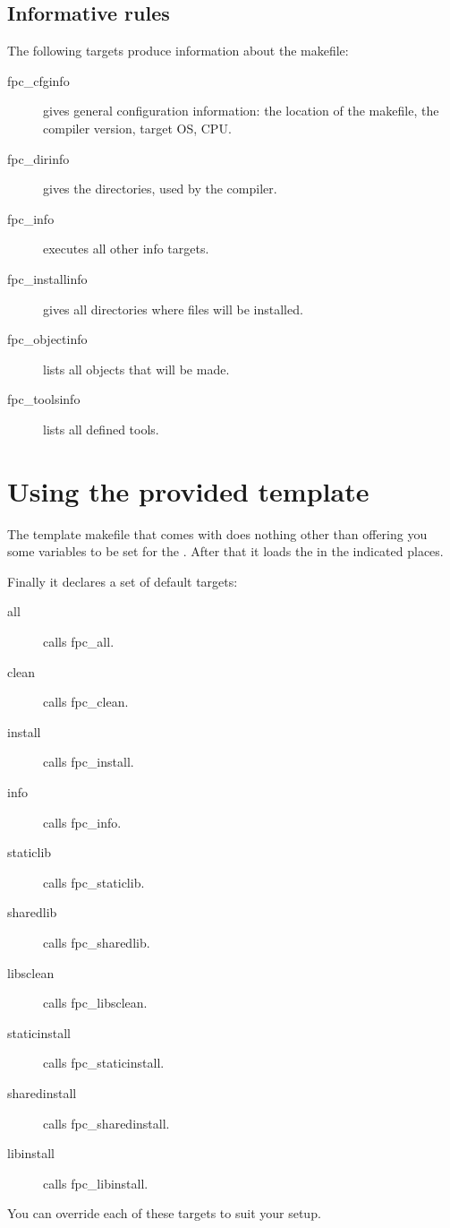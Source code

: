 \documentclass{report}
\begin{document}
\subsection{Informative rules}

The following targets produce information about the makefile:
\begin{description}
\item[fpc\_cfginfo] gives general configuration information: the location of
the makefile, the compiler version, target OS, CPU.
\item[fpc\_dirinfo] gives the directories, used by the compiler.
\item[fpc\_info] executes all other info targets.
\item[fpc\_installinfo] gives all directories where files will be installed.
\item[fpc\_objectinfo] lists all objects that will be made.
\item[fpc\_toolsinfo] lists all defined tools.
\end{description}

\section{Using the provided template}

The template makefile that comes with \fpc does nothing other than
offering you some variables to be set for the .
After that it loads the  in the indicated places.

Finally it declares a set of default targets:
\begin{description}
\item[all]  calls fpc\_all.
\item[clean]  calls fpc\_clean.
\item[install]  calls fpc\_install.
\item[info]  calls fpc\_info.
\item[staticlib]  calls fpc\_staticlib.
\item[sharedlib]  calls fpc\_sharedlib.
\item[libsclean]  calls fpc\_libsclean.
\item[staticinstall]  calls fpc\_staticinstall.
\item[sharedinstall]  calls fpc\_sharedinstall.
\item[libinstall]  calls fpc\_libinstall.
\end{description}

You can override each of these targets to suit your setup.
\end{document}
